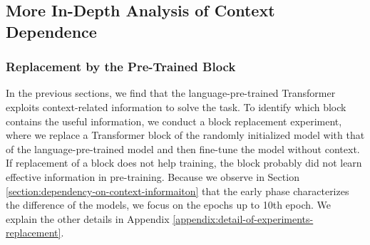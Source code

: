 \subsection{More In-Depth Analysis of Context Dependence}
\label{section:internal-analysis-to-see-the-dependence-on-context}

\subsubsection{Replacement by the Pre-Trained Block}
\label{section:replacement}
In the previous sections, we find that the language-pre-trained Transformer exploits context-related information to solve the task. To identify which block contains the useful information, we conduct a block replacement experiment, where we replace a Transformer block of the randomly initialized model with that of the language-pre-trained model and then fine-tune the model without context. If replacement of a block does not help training, the block probably did not learn effective information in pre-training. Because we observe in Section \ref{section:dependency-on-context-informaiton} that the early phase characterizes the difference of the models, we focus on the epochs up to 10th epoch. We explain the other details in Appendix \ref{appendix:detail-of-experiments-replacement}.

